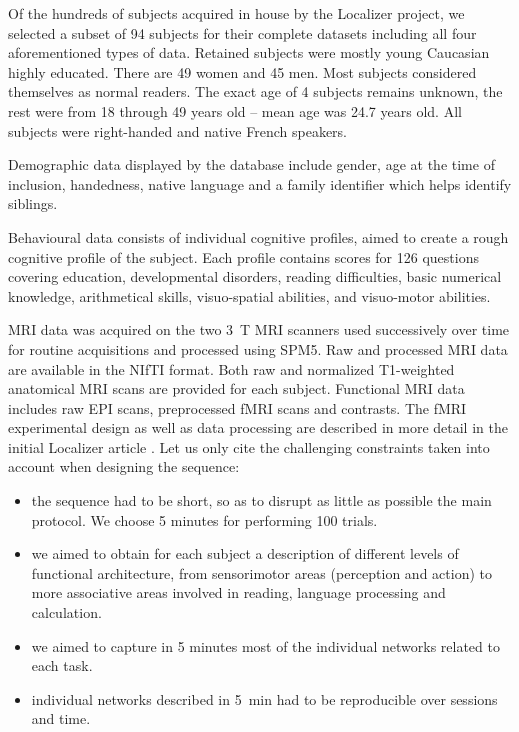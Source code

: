 \documentclass[review]{elsarticle}
\begin{document}
Of the hundreds of subjects acquired in house by the Localizer project, we
selected a subset of 94 subjects for their complete datasets \cite{Pinel2012}
including all four aforementioned types of data. Retained subjects were mostly
young Caucasian highly educated. There are 49 women and 45 men. Most subjects
considered themselves as normal readers. The exact age of 4 subjects remains
unknown, the rest were from 18 through 49 years old -- mean age was 24.7
years old. All subjects were right-handed and native French speakers.

Demographic data displayed by the database include gender, age at the time
of inclusion, handedness, native language and a family identifier which helps
identify siblings.

Behavioural data consists of individual cognitive profiles, aimed to create
a rough cognitive profile of the subject. Each profile contains scores for 126
questions covering education, developmental disorders, reading difficulties,
basic numerical knowledge, arithmetical skills, visuo-spatial abilities, and
visuo-motor abilities.

MRI data was acquired on the two 3~T MRI scanners used successively over
time for routine acquisitions and processed using SPM5. Raw and processed
MRI data are available in the NIfTI format. Both raw and normalized T1-weighted
anatomical MRI scans are provided for each subject. Functional MRI data includes
raw EPI scans, preprocessed fMRI scans and contrasts. The fMRI experimental design
as well as data processing are described in more detail in the initial Localizer
article \cite{Pinel2007}. Let us only cite the challenging constraints taken
into account when designing the sequence:
\begin{itemize}
\item the sequence had to be short, so as to disrupt as little as possible the main protocol. We choose 5 minutes for performing 100 trials.
\item we aimed to obtain for each subject a description of different levels of functional architecture, from sensorimotor areas (perception and action) to more associative areas involved in reading, language processing and calculation.
\item we aimed to capture in 5 minutes most of the individual networks related to each task.
\item individual networks described in 5~min had to be reproducible over sessions and time.
\end{itemize}
\end{document}
